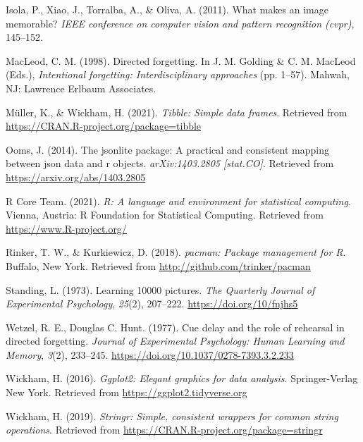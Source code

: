 \documentclass[
  english,
  man,floatsintext]{apa6}
\begin{document}
\leavevmode\hypertarget{ref-Isola2011}{}%
Isola, P., Xiao, J., Torralba, A., \& Oliva, A. (2011). What makes an image memorable? \emph{IEEE conference on computer vision and pattern recognition (cvpr)}, 145--152.

\leavevmode\hypertarget{ref-macleodDirectedForgetting1998}{}%
MacLeod, C. M. (1998). Directed forgetting. In J. M. Golding \& C. M. MacLeod (Eds.), \emph{Intentional forgetting: Interdisciplinary approaches} (pp. 1--57). Mahwah, NJ: Lawrence Erlbaum Associates.

\leavevmode\hypertarget{ref-R-tibble}{}%
Müller, K., \& Wickham, H. (2021). \emph{Tibble: Simple data frames}. Retrieved from \url{https://CRAN.R-project.org/package=tibble}

\leavevmode\hypertarget{ref-R-jsonlite}{}%
Ooms, J. (2014). The jsonlite package: A practical and consistent mapping between json data and r objects. \emph{arXiv:1403.2805 {[}stat.CO{]}}. Retrieved from \url{https://arxiv.org/abs/1403.2805}

\leavevmode\hypertarget{ref-R-base}{}%
R Core Team. (2021). \emph{R: A language and environment for statistical computing}. Vienna, Austria: R Foundation for Statistical Computing. Retrieved from \url{https://www.R-project.org/}

\leavevmode\hypertarget{ref-R-pacman}{}%
Rinker, T. W., \& Kurkiewicz, D. (2018). \emph{pacman: Package management for R}. Buffalo, New York. Retrieved from \url{http://github.com/trinker/pacman}

\leavevmode\hypertarget{ref-standingLearning10000Pictures1973}{}%
Standing, L. (1973). Learning 10000 pictures. \emph{The Quarterly Journal of Experimental Psychology}, \emph{25}(2), 207--222. \url{https://doi.org/10/fnjhs5}

\leavevmode\hypertarget{ref-WetzelC1977}{}%
Wetzel, R. E., Douglas C. Hunt. (1977). Cue delay and the role of rehearsal in directed forgetting. \emph{Journal of Experimental Psychology: Human Learning and Memory}, \emph{3}(2), 233--245. \url{https://doi.org/10.1037/0278-7393.3.2.233}

\leavevmode\hypertarget{ref-R-ggplot2}{}%
Wickham, H. (2016). \emph{Ggplot2: Elegant graphics for data analysis}. Springer-Verlag New York. Retrieved from \url{https://ggplot2.tidyverse.org}

\leavevmode\hypertarget{ref-R-stringr}{}%
Wickham, H. (2019). \emph{Stringr: Simple, consistent wrappers for common string operations}. Retrieved from \url{https://CRAN.R-project.org/package=stringr}
\end{document}
